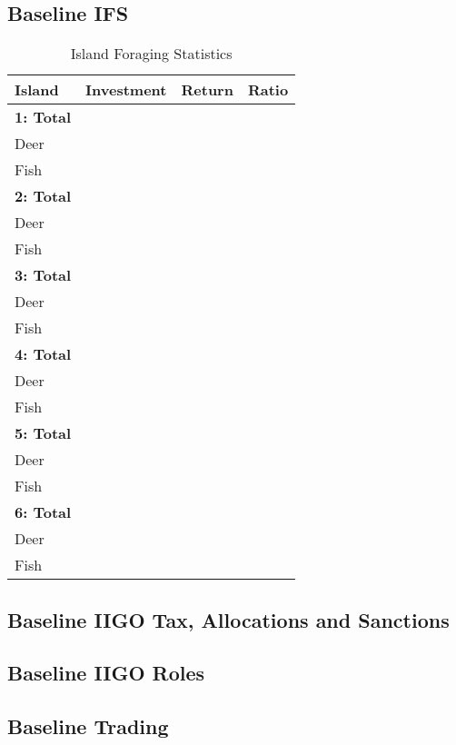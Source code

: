 \subsection{Baseline IFS}
\label{subsec:Simulations:baseline:ifs}
\begin{table}[htb]
    \centering
        \begin{tabular}{|l|l|l|l|}
        \hline
        Island            & Investment & Return & Ratio \\ \hline
        \textbf{1: Total} &            &        &       \\
        Deer              &            &        &       \\
        Fish              &            &        &       \\ \hline
        \textbf{2: Total} &            &        &       \\
        Deer              &            &        &       \\
        Fish              &            &        &       \\ \hline
        \textbf{3: Total} &            &        &       \\
        Deer              &            &        &       \\
        Fish              &            &        &       \\ \hline
        \textbf{4: Total} &            &        &       \\
        Deer              &            &        &       \\
        Fish              &            &        &       \\ \hline
        \textbf{5: Total} &            &        &       \\
        Deer              &            &        &       \\
        Fish              &            &        &       \\ \hline
        \textbf{6: Total} &            &        &       \\
        Deer              &            &        &       \\
        Fish              &            &        &       \\ \hline
\end{tabular}
\caption{Island Foraging Statistics}
\end{table}


\subsection{Baseline IIGO Tax, Allocations and Sanctions}
\label{subsec:Simulations:baseline:IIGO}


\subsection{Baseline IIGO Roles}
\label{subsec:Simulations:baseline:IIGO_roles}

\subsection{Baseline Trading}
\label{subsec:Simulations:baseline:trading}